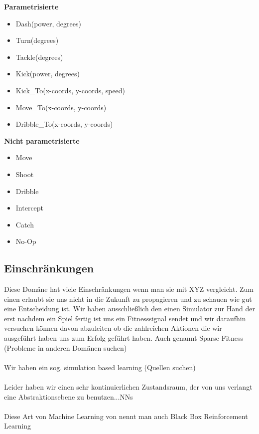             \begin{multicols}{2}
                \textbf{Parametrisierte}
                \begin{itemize}
                    \item Dash(power, degrees)
                    \item Turn(degrees)
                    \item Tackle(degrees)
                    \item Kick(power, degrees)
                    \item Kick\_To(x-coords, y-coords, speed)
                    \item Move\_To(x-coords, y-coords)
                    \item Dribble\_To(x-coords, y-coords)
                \end{itemize} \par
                \textbf{Nicht parametrisierte}
                \begin{itemize}
                    \item Move
                    \item Shoot
                    \item Dribble
                    \item Intercept
                    \item Catch
                    \item No-Op
                \end{itemize} \par
            \end{multicols}


        \subsection{Einschränkungen}
            Diese Domäne hat viele Einschränkungen wenn man sie mit XYZ vergleicht. Zum einen erlaubt sie uns nicht in die Zukunft zu propagieren und zu schauen wie gut eine Entscheidung ist. Wir haben ausschließlich den einen Simulator zur Hand der erst nachdem ein Spiel fertig ist uns ein Fitnesssignal sendet und wir daraufhin versuchen können davon abzuleiten ob die zahlreichen Aktionen die wir ausgeführt haben uns zum Erfolg geführt haben. Auch genannt Sparse Fitness (Probleme in anderen Domänen suchen)\\
            \\
            Wir haben ein sog. simulation based learning (Quellen suchen)\\
            \\
            Leider haben wir einen sehr kontinuierlichen Zustandsraum, der von uns verlangt eine Abstraktionsebene zu benutzen...NNs\\
            \\
            Diese Art von Machine Learning von nennt man auch Black Box Reinforcement Learning

